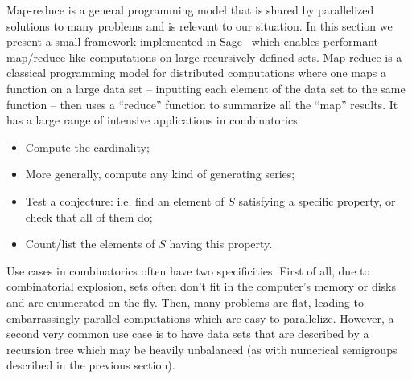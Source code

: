 \documentclass{deliverablereport}
\begin{document}
Map-reduce is a general programming model that is shared by
parallelized solutions to many problems and is relevant to our situation. In this section we
present a small framework implemented in Sage~\cite{sage} which enables
performant map/reduce-like computations on
large recursively defined sets. Map-reduce is a classical programming model
for distributed computations where one maps a function on a large data set --
inputting each element of the data set to the same function -- then
uses a ``reduce'' function to summarize all the ``map'' results. It has a
large range of intensive applications in combinatorics:
\begin{itemize}
  \item Compute the cardinality;
  \item More generally, compute any kind of generating series;
  \item Test a conjecture: i.e. find an element of $S$ satisfying a specific
    property, or check that all of them do;
  \item Count/list the elements of $S$ having this property.
\end{itemize}
Use cases in combinatorics often have two specificities: First of all, due to
combinatorial explosion, sets often don't fit in the computer's memory or
disks and are enumerated on the fly. Then, many problems are flat, leading to
embarrassingly parallel computations which are easy to parallelize. However, a
second very common use case is to have data sets that are described by a
recursion tree which may be heavily unbalanced (as with numerical semigroups
described in the previous section).
\end{document}
